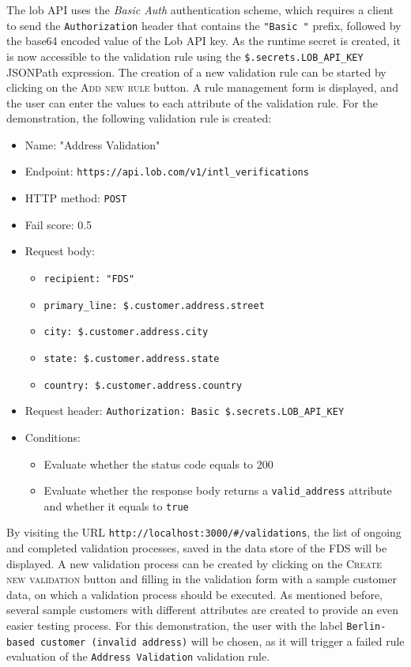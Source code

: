   The lob API uses the \emph{Basic Auth} authentication scheme, which requires a client to send the \verb;Authorization; header that contains the \verb;"Basic "; prefix, followed by the base64 encoded value of the Lob API key. As the runtime secret is created, it is now accessible to the validation rule using the \verb;$.secrets.LOB_API_KEY; JSONPath expression. The creation of a new validation rule can be started by clicking on the \textsc{Add new rule} button. A rule management form is displayed, and the user can enter the values to each attribute of the validation rule. For the demonstration, the following validation rule is created: 

  \begin{itemize}
   \item Name: "Address Validation"
   \item Endpoint: \verb;https://api.lob.com/v1/intl_verifications;
   \item HTTP method: \verb;POST;
   \item Fail score: 0.5
   \item Request body: 
     \begin{itemize}
       \item \verb;recipient: "FDS";
       \item \verb;primary_line: $.customer.address.street;
       \item \verb;city: $.customer.address.city;
       \item \verb;state: $.customer.address.state;
       \item \verb;country: $.customer.address.country;
     \end{itemize}
   \item Request header: \verb;Authorization: Basic $.secrets.LOB_API_KEY;
   \item Conditions:
     \begin{itemize}
      \item Evaluate whether the status code equals to 200
      \item Evaluate whether the response body returns a \verb;valid_address; attribute and whether it equals to \verb;true;
     \end{itemize}
  \end{itemize}
  
  By visiting the URL \verb;http://localhost:3000/#/validations;, the list of ongoing and completed validation processes, saved in the data store of the FDS will be displayed. A new validation process can be created by clicking on the \textsc{Create new validation} button and filling in the validation form with a sample customer data, on which a validation process should be executed. As mentioned before, several sample customers with different attributes are created to provide an even easier testing process. For this demonstration, the user with the label \verb;Berlin-based customer (invalid address); will be chosen, as it will trigger a failed rule evaluation of the \verb;Address Validation; validation rule. 

